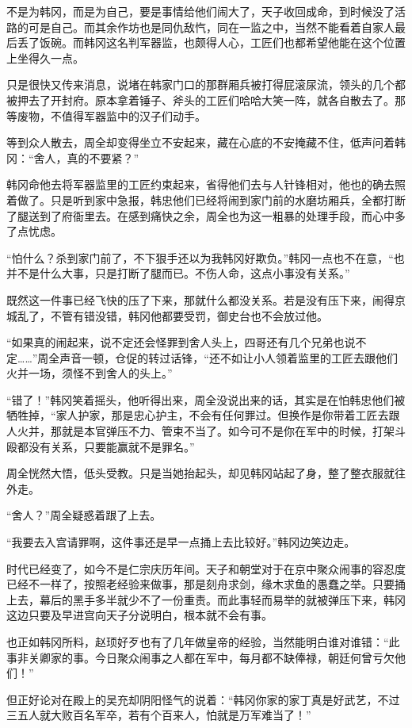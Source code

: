 不是为韩冈，而是为自己，要是事情给他们闹大了，天子收回成命，到时候没了活路的可是自己。而其余作坊也是同仇敌忾，同在一监之中，当然不能看着自家人最后丢了饭碗。而韩冈这名判军器监，也颇得人心，工匠们也都希望他能在这个位置上坐得久一点。

只是很快又传来消息，说堵在韩家门口的那群厢兵被打得屁滚尿流，领头的几个都被押去了开封府。原本拿着锤子、斧头的工匠们哈哈大笑一阵，就各自散去了。那等废物，不值得军器监中的汉子们动手。

等到众人散去，周全却变得坐立不安起来，藏在心底的不安掩藏不住，低声问着韩冈：“舍人，真的不要紧？”

韩冈命他去将军器监里的工匠约束起来，省得他们去与人针锋相对，他也的确去照着做了。只是听到家中急报，韩忠他们已经将闹到家门前的水磨坊厢兵，全都打断了腿送到了府衙里去。在感到痛快之余，周全也为这一粗暴的处理手段，而心中多了点忧虑。

“怕什么？杀到家门前了，不下狠手还以为我韩冈好欺负。”韩冈一点也不在意，“也并不是什么大事，只是打断了腿而已。不伤人命，这点小事没有关系。”

既然这一件事已经飞快的压了下来，那就什么都没关系。若是没有压下来，闹得京城乱了，不管有错没错，韩冈他都要受罚，御史台也不会放过他。

“如果真的闹起来，说不定还会怪罪到舍人头上，四哥还有几个兄弟也说不定……”周全声音一顿，仓促的转过话锋，“还不如让小人领着监里的工匠去跟他们火并一场，须怪不到舍人的头上。”

“错了！”韩冈笑着摇头，他听得出来，周全没说出来的话，其实是在怕韩忠他们被牺牲掉，“家人护家，那是忠心护主，不会有任何罪过。但换作是你带着工匠去跟人火并，那就是本官弹压不力、管束不当了。如今可不是你在军中的时候，打架斗殴都没有关系，只要能赢就不是罪名。”

周全恍然大悟，低头受教。只是当她抬起头，却见韩冈站起了身，整了整衣服就往外走。

“舍人？”周全疑惑着跟了上去。

“我要去入宫请罪啊，这件事还是早一点捅上去比较好。”韩冈边笑边走。

时代已经变了，如今不是仁宗庆历年间。天子和朝堂对于在京中聚众闹事的容忍度已经不一样了，按照老经验来做事，那是刻舟求剑，缘木求鱼的愚蠢之举。只要捅上去，幕后的黑手多半就少不了一份重责。而此事轻而易举的就被弹压下来，韩冈这边只要及早进宫向天子分说明白，根本就不会有事。

也正如韩冈所料，赵顼好歹也有了几年做皇帝的经验，当然能明白谁对谁错：“此事非关卿家的事。今日聚众闹事之人都在军中，每月都不缺俸禄，朝廷何曾亏欠他们！”

但正好论对在殿上的吴充却阴阳怪气的说着：“韩冈你家的家丁真是好武艺，不过三五人就大败百名军卒，若有个百来人，怕就是万军难当了！”

